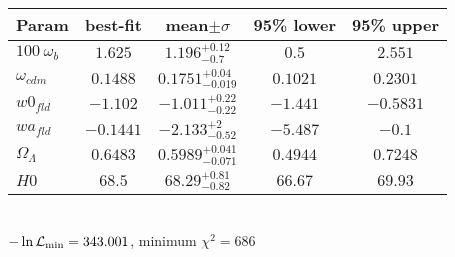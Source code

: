 \begin{tabular}{|l|c|c|c|c|} 
 \hline 
Param & best-fit & mean$\pm\sigma$ & 95\% lower & 95\% upper \\ \hline 
$100~\omega_{b }$ &$1.625$ & $1.196_{-0.7}^{+0.12}$ & $0.5$ & $2.551$ \\ 
$\omega_{cdm }$ &$0.1488$ & $0.1751_{-0.019}^{+0.04}$ & $0.1021$ & $0.2301$ \\ 
$w0_{fld }$ &$-1.102$ & $-1.011_{-0.22}^{+0.22}$ & $-1.441$ & $-0.5831$ \\ 
$wa_{fld }$ &$-0.1441$ & $-2.133_{-0.52}^{+2}$ & $-5.487$ & $-0.1$ \\ 
$\Omega_{\Lambda }$ &$0.6483$ & $0.5989_{-0.071}^{+0.041}$ & $0.4944$ & $0.7248$ \\ 
$H0$ &$68.5$ & $68.29_{-0.82}^{+0.81}$ & $66.67$ & $69.93$ \\ 
\hline 
 \end{tabular} \\ 
$-\ln{\cal L}_\mathrm{min} =343.001$, minimum $\chi^2=686$ \\ 

